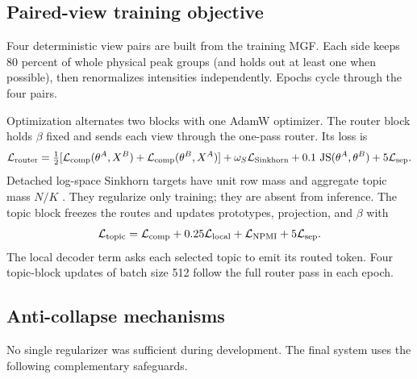 \documentclass[10pt,a4paper]{article}
\begin{document}
\subsection{Paired-view training objective}

Four deterministic view pairs are built from the training MGF. Each side keeps
80 percent of whole physical peak groups (and holds out at least one when
possible), then renormalizes intensities independently. Epochs cycle through
the four pairs.

Optimization alternates two blocks with one AdamW optimizer. The router block
holds $\beta$ fixed and sends each view through the one-pass router. Its loss is
\[
  \mathcal L_{\rm router}=
  \tfrac12[\mathcal L_{\rm comp}(\theta^A,X^B)+
           \mathcal L_{\rm comp}(\theta^B,X^A)]
  +\omega_S\mathcal L_{\rm Sinkhorn}
  +0.1\,\operatorname{JS}(\theta^A,\theta^B)
  +5\mathcal L_{\rm sep}.
\]
Detached log-space Sinkhorn targets have unit row mass and aggregate topic mass
$N/K$ \cite{cuturi2013,caron2020}. They regularize only training; they are absent
from inference. The topic block freezes the routes and updates prototypes,
projection, and $\beta$ with
\[
  \mathcal L_{\rm topic}=
  \mathcal L_{\rm comp}+0.25\mathcal L_{\rm local}
  +\mathcal L_{\rm NPMI}+5\mathcal L_{\rm sep}.
\]
The local decoder term asks each selected topic to emit its routed token. Four
topic-block updates of batch size 512 follow the full router pass in each epoch.

\subsection{Anti-collapse mechanisms}

No single regularizer was sufficient during development. The final system uses
the following complementary safeguards.
\end{document}
